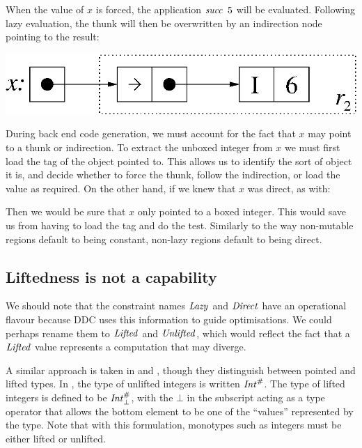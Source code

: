 When the value of $x$ is forced, the application $\operatorname{\mathit{succ}} \ 5$ will be evaluated. Following lazy evaluation, the thunk will then be overwritten by an indirection node pointing to the result:

\begin{center}
\includegraphics[scale=0.5]{2-System/fig/class-lazy-indir}
\end{center}

During back end code generation, we must account for the fact that $x$ may point to a thunk or indirection. To extract the unboxed integer from $x$ we must first load the tag of the object pointed to. This allows us to identify the sort of object it is, and decide whether to force the thunk, follow the indirection, or load the value as required. On the other hand, if we knew that $x$ was direct, as with:


Then we would be sure that $x$ only pointed to a boxed integer. This would save us from having to load the tag and do the test. Similarly to the way non-mutable regions default to being constant, non-lazy regions default to being direct.

\subsection{Liftedness is not a capability}
\label{System:Effects:liftedness}

We should note that the constraint names $\operatorname{\mathit{Lazy}}$ and $\operatorname{\mathit{Direct}}$ have an operational flavour because DDC uses this information to guide optimisations. We could perhaps rename them to $\operatorname{\mathit{Lifted}}$ and $\operatorname{\mathit{Unlifted}}$, which would reflect the fact that a $\operatorname{\mathit{Lifted}}$ value represents a computation that may diverge. 

A similar approach is taken in \cite{launchbury:unboxing-unpointed-types} and \cite{peyton-jones:bridging-the-gulf}, though they distinguish between pointed and lifted types. In \cite{launchbury:unboxing-unpointed-types}, the type of unlifted integers is written $\operatorname{\mathit{Int}}^{\#}$. The type of lifted integers is defined to be $\operatorname{\mathit{Int}}^{\#}_{\bot}$, with the $\bot$ in the subscript acting as a type operator that allows the bottom element to be one of the ``values'' represented by the type. Note that with this formulation, monotypes such as integers must be either lifted or unlifted. 

